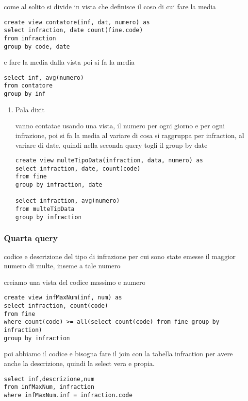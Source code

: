 \documentclass[11pt]{article}
\begin{document}
come al solito si divide in vista che definisce il coso di cui fare la media
\begin{verbatim}
create view contatore(inf, dat, numero) as
select infraction, date count(fine.code)
from infraction
group by code, date
\end{verbatim}
e fare la media dalla vista poi si fa la media
\begin{verbatim}
select inf, avg(numero)
from contatore
group by inf
\end{verbatim}
\begin{enumerate}
\item Pala dixit
\label{sec:org5519fc1}

vanno contatae usando una vista, il numero per ogni giorno e per ogni infrazione, poi si
fa la media al variare di cosa
si raggruppa per infraction, al variare di date, quindi nella seconda query togli il group
by date

\begin{verbatim}
create view multeTipoData(infraction, data, numero) as
select infraction, date, count(code)
from fine
group by infraction, date

select infraction, avg(numero)
from multeTipData
group by infraction
\end{verbatim}
\end{enumerate}

\subsubsection{Quarta query}
\label{sec:org0b0ad21}
codice e descrizione del tipo di infrazione per cui sono state emesse il maggior numero di
multe, inseme a tale numero

creiamo una vista del codice massimo e numero
\begin{verbatim}
create view infMaxNum(inf, num) as
select infraction, count(code)
from fine
where count(code) >= all(select count(code) from fine group by infraction)
group by infraction
\end{verbatim}

poi abbiamo il codice e bisogna fare il join con la tabella infraction per avere anche la
descrizione, quindi la select vera e propia.
\begin{verbatim}
select inf,descrizione,num
from infMaxNum, infraction
where infMaxNum.inf = infraction.code
\end{verbatim}
\end{document}
